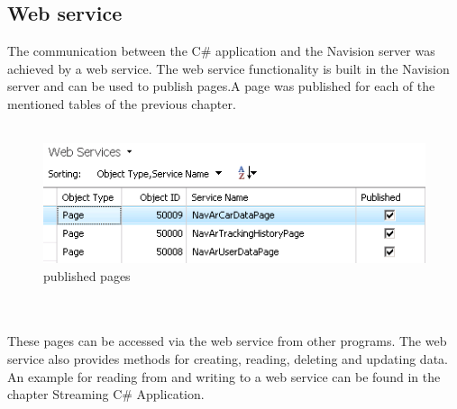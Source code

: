 \subsection{Web service}
The communication between the C\# application and the Navision server was achieved by a web service. The web service functionality is built in the Navision server and can be used to publish pages.A page was published for each of the mentioned tables of the previous chapter. 
\\\\
\begin{figure}[htbp]
\centering
\includegraphics[width=\textwidth,height=\textheight,keepaspectratio]{graphics/webservice.png}
\caption{published pages}
\end{figure}
\\\\
These pages can be accessed via the web service from other programs. The web service also provides methods for creating, reading, deleting and updating data.
An example for reading from and writing to a web service can be found in the chapter Streaming C\# Application.   
\newpage
